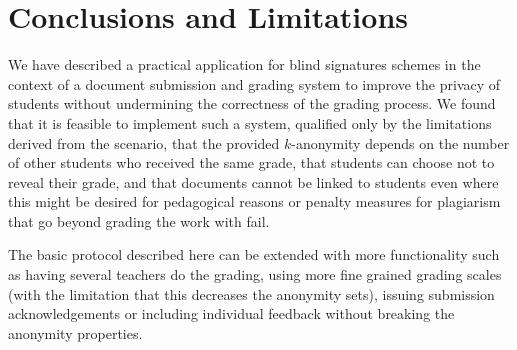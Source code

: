 \section{Conclusions and Limitations}
    \label{section:document-submission-system:conclusions-future-work}

We have described a practical application for blind signatures schemes in the context 
of a document submission and grading system to 
improve the privacy of students without undermining the correctness 
of the grading process.
%
%
%
We found that it is feasible to implement such a
system, qualified
only by the limitations derived from the scenario, \eg that the provided
$k$-anonymity depends on the number of other students who received the
same grade, that students can choose not to reveal their grade, and that
documents cannot be linked to students even where this might be desired
for pedagogical reasons or penalty measures for plagiarism
that go beyond grading the work with fail.
%

The basic protocol described here can be extended with more
functionality such as having several teachers do the grading, using more
fine grained grading scales (with the limitation that this decreases the
anonymity sets), issuing submission acknowledgements or including
individual feedback without breaking the anonymity properties.

